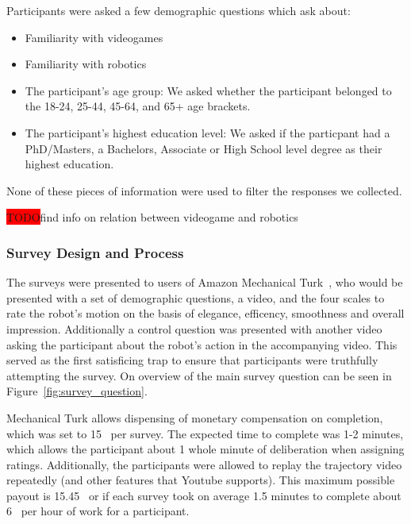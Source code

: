 \documentclass[letterpaper, 10 pt, conference]{ieeeconf}  %
\newcommand{\todo}{\colorbox{red}{TODO}}
\begin{document}
Participants were asked a few demographic questions which ask about:

\begin{itemize}
\item Familiarity with videogames
\item Familiarity with robotics
\item The participant's age group: We asked whether the participant belonged to the 18-24, 25-44, 45-64, and 65+ age brackets.
\item The participant's highest education level: We asked if the particpant had a PhD/Masters, a Bachelors, Associate or High School level degree as their highest education.
\end{itemize}

None of these pieces of information were used to filter the responses we collected.

\todo find info on relation between videogame and robotics

\subsubsection{Survey Design and Process}

The surveys were presented to users of Amazon Mechanical Turk~\cite{paolacci2010running}, who would be presented with a set of demographic questions, a video, and the four scales to rate the robot's motion on the basis of elegance, efficency, smoothness and overall impression. Additionally a control question was presented with another video asking the participant about the robot's action in the accompanying video. This served as the first satisficing trap to ensure that participants were truthfully attempting the survey. On overview of the main survey question can be seen in Figure~\ref{fig:survey_question}.

Mechanical Turk allows dispensing of monetary compensation on completion, which was set to 15\textcent~ per survey. The expected time to complete was 1-2 minutes, which allows the participant about 1 whole minute of deliberation when assigning ratings. Additionally, the participants were allowed to replay the trajectory video repeatedly (and other features that Youtube supports). This maximum possible payout is 15.45\textdollar~ or if each survey took on average 1.5 minutes to complete about 6\textdollar~ per hour of work for a participant.
\end{document}
